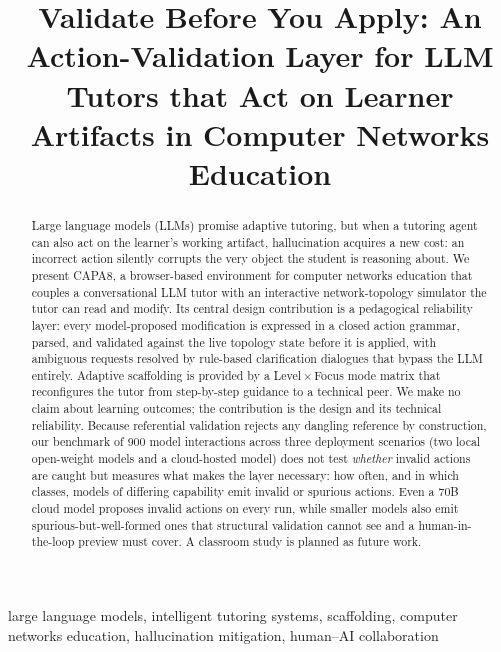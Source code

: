 \documentclass[conference,a4paper]{IEEEtran}
\newcommand{\bTotalCalls}{900} %
\begin{document}
\title{Validate Before You Apply: An Action-Validation Layer for LLM Tutors that Act on Learner Artifacts in Computer Networks Education}

\author{
}

\maketitle

\begin{abstract}
Large language models (LLMs) promise adaptive tutoring, but when a tutoring agent can also act on the learner's working artifact, hallucination acquires a new cost: an incorrect action silently corrupts the very object the student is reasoning about. We present CAPA8, a browser-based environment for computer networks education that couples a conversational LLM tutor with an interactive network-topology simulator the tutor can read and modify. Its central design contribution is a pedagogical reliability layer: every model-proposed modification is expressed in a closed action grammar, parsed, and validated against the live topology state before it is applied, with ambiguous requests resolved by rule-based clarification dialogues that bypass the LLM entirely. Adaptive scaffolding is provided by a Level\,$\times$\,Focus mode matrix that reconfigures the tutor from step-by-step guidance to a technical peer. We make no claim about learning outcomes; the contribution is the design and its technical reliability. Because referential validation rejects any dangling reference by construction, our benchmark of \bTotalCalls{} model interactions across three deployment scenarios (two local open-weight models and a cloud-hosted model) does not test \emph{whether} invalid actions are caught but measures what makes the layer necessary: how often, and in which classes, models of differing capability emit invalid or spurious actions. Even a 70B cloud model proposes invalid actions on every run, while smaller models also emit spurious-but-well-formed ones that structural validation cannot see and a human-in-the-loop preview must cover. A classroom study is planned as future work.
\end{abstract}

\begin{IEEEkeywords}
large language models, intelligent tutoring systems, scaffolding, computer networks education, hallucination mitigation, human--AI collaboration
\end{IEEEkeywords}
\end{document}
